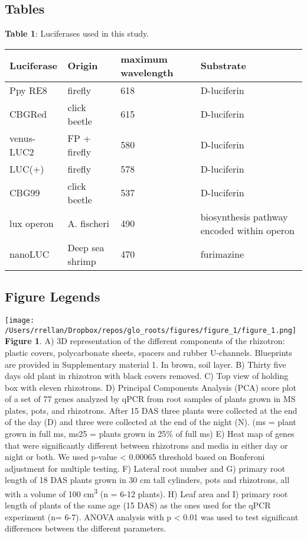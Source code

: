 \documentclass[]{article}
\begin{document}
\subsection{Tables}\label{tables}

\textbf{Table 1}: Luciferases used in this study.

\begin{longtable}[c]{@{}llll@{}}
\toprule
Luciferase & Origin & maximum wavelength & Substrate\tabularnewline
\midrule
\endhead
Ppy RE8 & firefly & 618 & D-luciferin\tabularnewline
CBGRed & click beetle & 615 & D-luciferin\tabularnewline
venus-LUC2 & FP + firefly & 580 & D-luciferin\tabularnewline
LUC(+) & firefly & 578 & D-luciferin\tabularnewline
CBG99 & click beetle & 537 & D-luciferin\tabularnewline
lux operon & A. fischeri & 490 & biosynthesis pathway encoded within
operon\tabularnewline
nanoLUC & Deep sea shrimp & 470 & furimazine\tabularnewline
\bottomrule
\end{longtable}

\subsection{Figure Legends}\label{figure-legends}

\texttt{[image: /Users/rrellan/Dropbox/repos/glo\_roots/figures/figure\_1/figure\_1.png]}\\\textbf{Figure
1}. A) 3D representation of the different components of the rhizotron:
plastic covers, polycarbonate sheets, spacers and rubber U-channels.
Blueprints are provided in Supplementary material 1. In brown, soil
layer. B) Thirty five days old plant in rhizotron with black covers
removed. C) Top view of holding box with eleven rhizotrons. D) Principal
Components Analysis (PCA) score plot of a set of 77 genes analyzed by
qPCR from root samples of plants grown in MS plates, pots, and
rhizotrons. After 15 DAS three plants were collected at the end of the
day (D) and three were collected at the end of the night (N). (ms =
plant grown in full ms, ms25 = plants grown in 25\% of full ms) E) Heat
map of genes that were significantly different between rhizotrons and
media in either day or night or both. We used p-value \textless{}
0.00065 threshold based on Bonferoni adjustment for multiple testing. F)
Lateral root number and G) primary root length of 18 DAS plants grown in
30 cm tall cylinders, pots and rhizotrons, all with a volume of 100
cm\textsuperscript{3} (n = 6-12 plants). H) Leaf area and I) primary
root length of plants of the same age (15 DAS) as the ones used for the
qPCR experiment (n= 6-7). ANOVA analysis with p \textless{} 0.01 was
used to test significant differences between the different parameters.
\end{document}
